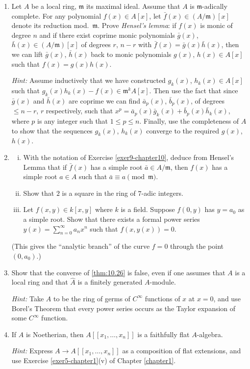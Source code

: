 \begin{enumerate}
    \textit{Hint:} Use Chapter \ref{chapter3}, Exercise \ref{exer17-chapter3}, and Exercise \ref{exer7-chapter10} above.

    \item \label{exer9-chapter10} Let $A$ be a local ring, $\mathfrak{m}$ its maximal ideal. Assume that $A$ is $\mathfrak{m}$-adically complete. For any polynomial $f(x) \in A[x]$, let $\bar{f}(x) \in (A/\mathfrak{m})[x]$ denote its reduction mod.\ $\mathfrak{m}$. Prove \emph{Hensel's lemma}: if $f(x)$ is monic of degree $n$ and if there exist coprime monic polynomials $\bar{g}(x)$, $\bar{h}(x) \in (A/\mathfrak{m})[x]$ of degrees $r$, $n-r$ with $\bar{f}(x) = \bar{g}(x)\bar{h}(x)$, then we can lift $\bar{g}(x)$, $\bar{h}(x)$ back to monic polynomials $g(x)$, $h(x) \in A[x]$ such that $f(x) = g(x)h(x)$.
    
    \textit{Hint:} Assume inductively that we have constructed $g_k(x)$, $h_k(x) \in A[x]$ such that $g_k(x)h_k(x) - f(x) \in \mathfrak{m}^k A[x]$. Then use the fact that since $\bar{g}(x)$ and $\bar{h}(x)$ are coprime we can find $\bar{a}_p(x)$, $\bar{b}_p(x)$, of degrees $\le n-r$, $r$ respectively, such that $x^p = \bar{a}_p(x)\bar{g}_k(x) + \bar{b}_p(x)\bar{h}_k(x)$, where $p$ is any integer such that $1 \le p \le n$. Finally, use the completeness of $A$ to show that the sequences $g_k(x)$, $h_k(x)$ converge to the required $g(x)$, $h(x)$.

    \item \label{exer10-chapter10}\begin{enumerate}[i)]
        \item With the notation of Exercise \ref{exer9-chapter10}, deduce from Hensel's Lemma that if $\bar{f}(x)$ has a simple root $\bar{a} \in A/\mathfrak{m}$, then $f(x)$ has a simple root $a \in A$ such that $\bar{a} \equiv a \pmod{\mathfrak{m}}$.
        \item Show that $2$ is a square in the ring of $7$-adic integers.
        \item Let $f(x, y) \in k[x, y]$ where $k$ is a field. Suppose $f(0, y)$ has $y = a_0$ as a simple root. Show that there exists a formal power series $y(x) = \sum_{n=0}^\infty a_n x^n$ such that $f(x, y(x)) = 0$.
    \end{enumerate}
    (This gives the ``analytic branch'' of the curve $f = 0$ through the point $(0, a_0)$.)

    \item Show that the converse of \eqref{thm:10.26} is false, even if one assumes that $A$ is a local ring and that $\widehat{A}$ is a finitely generated $A$-module. 
    
    \textit{Hint:} Take $A$ to be the ring of germs of $C^{\infty}$ functions of $x$ at $x = 0$, and use Borel's Theorem that every power series occurs as the Taylor expansion of some $C^{\infty}$ function.

    \item If $A$ is Noetherian, then $A[[x_1, \ldots, x_n]]$ is a faithfully flat $A$-algebra. 
    
    \textit{Hint:} Express $A \to A[[x_1, \ldots, x_n]]$ as a composition of flat extensions, and use Exercise \ref{exer5-chapter1}(v) of Chapter \ref{chapter1}.
\end{enumerate}
